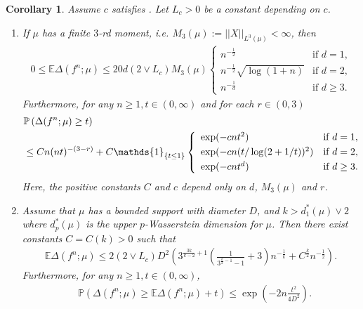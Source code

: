 \documentclass{amsart}
\theoremstyle{plain}
\numberwithin{equation}{section}\newtheorem{theorem}{Theorem}[section]
\newtheorem{corollary}[theorem]{Corollary}
\theoremstyle{remark}
\begin{document}
\begin{corollary}\label{cor: sample complexity of generalization error}
Assume $c$ satisfies . Let $L_c > 0$ be a constant depending on $c$. 
\begin{enumerate}
    \item[(i)] If $\mu$ has a finite $3$-rd moment, i.e. $M_3(\mu):=||X||_{L^3(\mu)} < \infty$, then
\begin{equation*}
    \begin{aligned}
    0 \leq \mathbb{E}\Delta(f^n;\mu) \leq 20 d (2 \vee L_c) M_3(\mu)  
    \left\{ 
    \begin{array}{ll}
    n^{-\frac{1}{2}} & \textrm{if $d=1$,}\\
    n^{-\frac{1}{2}}\sqrt{\log (1 + n)} & \textrm{if $d=2$,}\\
    n^{-\frac{1}{d}} & \textrm{if $d \geq 3$.}
    \end{array} 
    \right.
    \end{aligned}
\end{equation*}
Furthermore, for any $n \geq 1, t \in (0,\infty)$ and for each $r \in (0, 3)$
\begin{align*}
    &\mathbb{P}\left( \Delta(f^n;\mu) \geq t \right)\\
    &\leq C
    n (nt)^{-(3 -r)} + C \mathds{1}_{\{t\leq 1\}}
    \left\{\begin{array}{ll}
    \exp(-cnt^2) & \hbox{if $d=1$}, \\[+3pt]
    \exp(-cn(t/\log(2+1/t))^2) & \hbox{if $d=2$}, \\[+3pt]
    \exp(-cn t^{d}) & \hbox{if $d \geq 3$}.
\end{array}\right.
\end{align*}
Here, the positive constants $C$ and $c$ depend only on $d$, $M_3(\mu)$ and $r$.

    \item[(ii)] Assume that $\mu$ has a bounded support with diameter $D$, and $k > d^*_1(\mu) \vee 2$ where $d^*_p(\mu)$ is the upper $p$-Wasserstein dimension for $\mu$. Then there exist constants $C=C(k) > 0$ such that
\begin{align*}
    \mathbb{E} \Delta(f^n;\mu) \leq 2 (2 \vee L_c) D^2  \left(3^{\frac{3k}{k - 2} + 1}\left( \frac{1}{3^{\frac{k}{2} - 1} - 1} + 3 \right) n^{- \frac{1}{k}} + C^{\frac{k}{2}} n^{- \frac{1}{2}} \right). 
\end{align*}
Furthermore, for any $n \geq 1, t \in (0,\infty)$,
\begin{align*}
    &\mathbb{P} \left(  \Delta(f^n;\mu) \geq \mathbb{E}  \Delta(f^n;\mu) + t \right) \leq \exp\left(-2n\frac{t^2}{4D^2} \right).
\end{align*}
\end{enumerate}    
\end{corollary}
\end{document}
